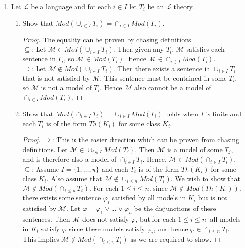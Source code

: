 \documentclass{article}
\begin{document}
\begin{enumerate}
  \item Let $\mathcal{L}$ be a language and for each $i\in I$ let $T_i$ be
    an $\mathcal{L}$ theory.
    \begin{enumerate}
      \item Show that $Mod(\cup_{i\in I}T_i)=\cap_{i\in I}Mod(T_i)$.
        \begin{proof}
          The equality can be proven by chasing definitions. \\

          $\subseteq$: Let $\mathcal{M}\in Mod(\cup_{i\in I}T_i)$. Then
          given any $T_i$, $\mathcal{M}$ satisfies each sentence in $T_i$,
          so $\mathcal{M}\in Mod(T_i)$. Hence $\mathcal{M}\in \cap_{i\in
          I}Mod(T_i)$. \\

          $\supseteq$: Let $\mathcal{M}\not\in Mod(\cup_{i\in I}T_i)$.
          Then there exists a sentence in $\cup_{i\in I}T_i$ that is
          not satisfied by $\mathcal{M}$. This sentence must be contained
          in some $T_i$, so $\mathcal{M}$ is not a model of $T_i$. Hence
          $\mathcal{M}$ also cannot be a model of $\cap_{i\in I}Mod(T_i)$.
        \end{proof}

      \item Show that $Mod(\cap_{i\in I}T_i)=\cup_{i\in I}Mod(T_i)$ holds
        when $I$ is finite and each $T_i$ is of the form $Th(K_i)$ for some
        class $K_i$.

        \begin{proof}
          $\supseteq$: This is the easier direction which can be proven
          from chasing definitions. Let $\mathcal{M}\in \cup_{i\in
          I}Mod(T_i)$. Then $\mathcal{M}$ is a model of some $T_j$, and is
          therefore also a model of $\cap_{i\in I}T_i$. Hence,
          $\mathcal{M}\in Mod(\cap_{i\in I}T_i)$. \\

          $\subseteq$: Assume $I=\{1,\ldots,n\}$ and each $T_i$ is of the
          form $Th(K_i)$ for some class $K_i$. Also assume that
          $\mathcal{M}\not\in\cup_{i\leq n}Mod(T_i)$. We wish to show that
          $\mathcal{M}\not\in Mod(\cap_{i\leq n}T_i)$. For each $1\leq
          i\leq n$, since $\mathcal{M}\not\in Mod(Th(K_i))$, there exists some
          sentence $\varphi_i$ satisfied by all models in $K_i$ but is not
          satisfied by $\mathcal{M}$. Let
          $\varphi=\varphi_1\vee\ldots\vee\varphi_n$ be the disjunctions
          of these sentences. Then $\mathcal{M}$ does not satisfy
          $\varphi$, but for each $1\leq i\leq n$, all models in $K_i$
          satisfy $\varphi$ since these models satisfy $\varphi_i$, and
          hence $\varphi\in\cap_{i\leq n}T_i$. This implies
          $\mathcal{M}\not\in Mod(\cap_{i\leq n}T_i)$ as we are required to
          show.
        \end{proof}
    \end{enumerate}
\end{enumerate}
\end{document}
